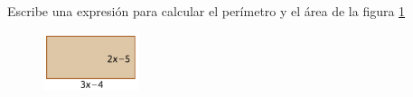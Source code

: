\question[10] Escribe una expresión para calcular el perímetro y el área de la figura \ref{fig:20230319044552}

\begin{figure}[H]
    \centering
    \includegraphics[width=0.25\textwidth]{../images/20230319044552}
    \caption{}
    \label{fig:20230319044552}
\end{figure}